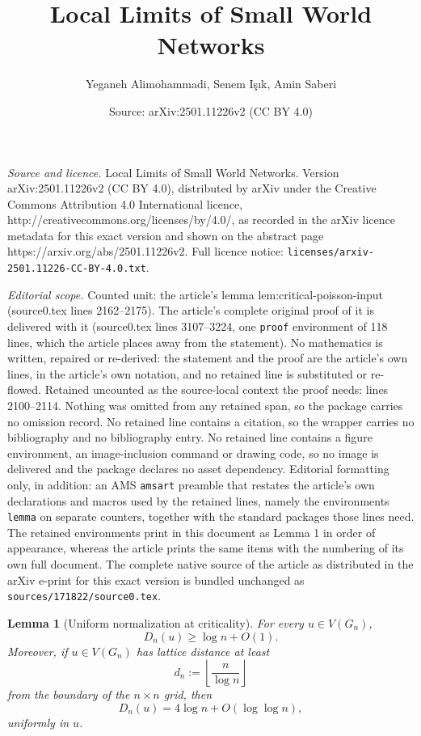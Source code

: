\documentclass[10pt,a4paper]{amsart}
\title{Local Limits of Small World Networks}
\author{Yeganeh Alimohammadi, Senem I\c{s}\i k, Amin Saberi}
\date{Source: arXiv:2501.11226v2 (CC BY 4.0)}
\newtheorem{lemma}{Lemma}
\begin{document}
\maketitle

\noindent\emph{Source and licence.} Local Limits of Small World Networks. Version arXiv:2501.11226v2 (CC BY 4.0), distributed by arXiv under the Creative Commons Attribution 4.0 International licence, http://creativecommons.org/licenses/by/4.0/, as recorded in the arXiv licence metadata for this exact version and shown on the abstract page https://arxiv.org/abs/2501.11226v2. Full licence notice: \texttt{licenses/arxiv-2501.11226-CC-BY-4.0.txt}.\par\smallskip

\noindent\textit{Editorial scope.} Counted unit: the article's lemma lem:critical-poisson-input (source0.tex lines 2162--2175). The article's complete original proof of it is delivered with it (source0.tex lines 3107--3224, one \texttt{proof} environment of 118 lines, which the article places away from the statement). No mathematics is written, repaired or re-derived: the statement and the proof are the article's own lines, in the article's own notation, and no retained line is substituted or re-flowed.  Retained uncounted as the source-local context the proof needs: lines 2100--2114.  Nothing was omitted from any retained span, so the package carries no omission record.  No retained line contains a citation, so the wrapper carries no bibliography and no bibliography entry.  No retained line contains a figure environment, an image-inclusion command or drawing code, so no image is delivered and the package declares no asset dependency.  Editorial formatting only, in addition: an AMS \texttt{amsart} preamble that restates the article's own declarations and macros used by the retained lines, namely the environments \texttt{lemma} on separate counters, together with the standard packages those lines need.  The retained environments print in this document as Lemma 1 in order of appearance, whereas the article prints the same items with the numbering of its own full document.  The complete native source of the article as distributed in the arXiv e-print for this exact version is bundled unchanged as \texttt{sources/171822/source0.tex}.
\begin{lemma}[Uniform normalization at criticality]\label{lem:uniform-normalization}
For every \(u\in V(G_n)\),
\[
D_n(u)\ge \log n+O(1).
\]
Moreover, if \(u\in V(G_n)\) has lattice distance at least
\[
d_n:=\left\lfloor \frac{n}{\log n}\right\rfloor
\]
from the boundary of the \(n\times n\) grid, then
\[
D_n(u)=4\log n+O(\log\log n),
\]
uniformly in \(u\).
\end{lemma}
\end{document}
